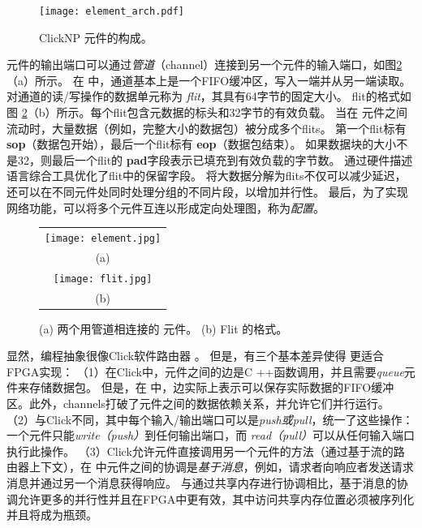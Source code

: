 \begin{figure}[htbp]
\centering
\texttt{[image: element\_arch.pdf]}
\caption{ClickNP 元件的构成。}
\label{clicknp:fig:element_arch}
\end{figure}

元件的输出端口可以通过\textit {管道}（channel）连接到另一个元件的输入端口，如图\ref {clicknp:fig:element}（a）所示。
在 \name 中，通道基本上是一个FIFO缓冲区，写入一端并从另一端读取。
对通道的读/写操作的数据单元称为 \textit {flit}，其具有64字节的固定大小。
flit的格式如图 \ref {clicknp:fig:element}（b）所示。每个flit包含元数据的标头和32字节的有效负载。
当在 \name 元件之间流动时，大量数据（例如，完整大小的数据包）被分成多个flits。
第一个flit标有 \textbf {sop}（数据包开始），最后一个flit标有 \textbf {eop}（数据包结束）。
如果数据块的大小不是32，则最后一个flit的 \textbf {pad}字段表示已填充到有效负载的字节数。
通过硬件描述语言综合工具优化了flit中的保留字段。
将大数据分解为flits不仅可以减少延迟，还可以在不同元件处同时处理分组的不同片段，以增加并行性。
最后，为了实现网络功能，可以将多个\name 元件互连以形成定向处理图，称为\name \textit {配置}。

\begin{figure}[htbp]
	\centering
	\begin{tabular}{c}
		\texttt{[image: element.jpg]}  \\
		(a)\\
		\texttt{[image: flit.jpg]} \\
		(b) \\
	\end{tabular}
	\caption{(a) 两个用管道相连接的 \name 元件。 (b) Flit 的格式。}
	\label{clicknp:fig:element}
\end{figure}


显然，\name 编程抽象很像Click软件路由器 \cite {kohler2000click}。
但是，有三个基本差异使得 \name 更适合FPGA实现：
（1）在Click中，元件之间的边是C ++函数调用，并且需要\textit {queue}元件来存储数据包。
但是，在 \name 中，边实际上表示可以保存实际数据的FIFO缓冲区。此外，\name  channels打破了元件之间的数据依赖关系，并允许它们并行运行。
（2）与Click不同，其中每个输入/输出端口可以是\textit {push或pull}，\name 统一了这些操作：一个元件只能\textit {write（push）}到任何输出端口，而 \textit {read（pull）}可以从任何输入端口执行此操作。
（3）Click允许元件直接调用另一个元件的方法（通过基于流的路由器上下文），在 \name 中元件之间的协调是\textit {基于消息}，例如，请求者向响应者发送请求消息并通过另一个消息获得响应。
与通过共享内存进行协调相比，基于消息的协调允许更多的并行性并且在FPGA中更有效，其中访问共享内存位置必须被序列化并且将成为瓶颈。

